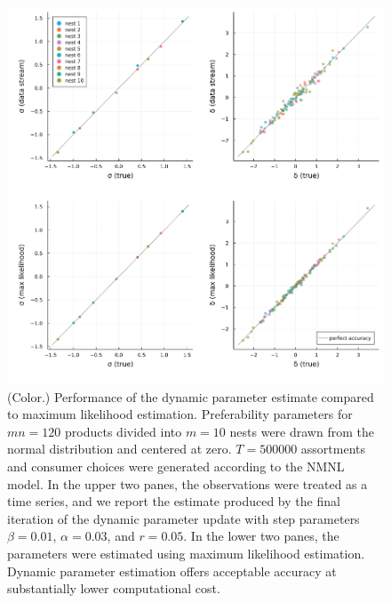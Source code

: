 \documentclass[preprint,12pt,authoryear]{elsarticle}
\begin{document}
\begin{figure}
\begin{center}\includegraphics[width=\linewidth, ]{param-est-dynamic-nested-as-static.png}\end{center}
\captionsetup{singlelinecheck=off}
    \caption[.]{(Color.) Performance of the dynamic parameter estimate compared to maximum likelihood estimation. Preferability parameters for $mn = 120$ products divided into $m=10$ nests were drawn from the normal distribution and centered at zero. $T=500000$ assortments and consumer choices were generated according to the NMNL model. In the upper two panes, the observations were treated as a time series, and we report the estimate produced by the final iteration of the dynamic parameter update with step parameters $\beta = 0.01$, $\alpha = 0.03$, and $r = 0.05$. In the lower two panes, the parameters were estimated using maximum likelihood estimation. Dynamic parameter estimation offers acceptable accuracy at substantially lower computational cost.}
\label{param-est-dynamic-nested-as-static}
\end{figure}
\end{document}
